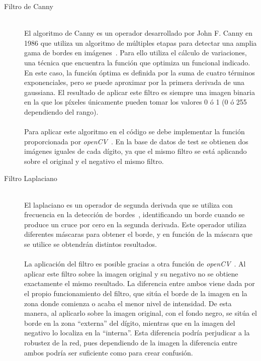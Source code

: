 \begin{description}
	\item[Filtro de Canny] \hfill 
	\vspace{5pt}
	\\
	El algoritmo de Canny es un operador desarrollado por John F. Canny en 1986 que utiliza un algoritmo de múltiples etapas para detectar una amplia gama de bordes en imágenes~\cite{4767851}. Para ello utiliza el cálculo de variaciones, una técnica que encuentra la función que optimiza un funcional indicado. En este caso, la función óptima es definida por la suma de cuatro términos exponenciales, pero se puede aproximar por la primera derivada de una gaussiana. El resultado de aplicar este filtro es siempre una imagen binaria en la que los píxeles únicamente pueden tomar los valores 0 ó 1 (0 ó 255 dependiendo del rango).\\
	\vspace{-10pt}
	\\
	Para aplicar este algoritmo en el código se debe implementar la función proporcionada por \textit{openCV}~\cite{cannyOCV}. En la base de datos de test se obtienen dos imágenes iguales de cada dígito, ya que el mismo filtro se está aplicando sobre el original y el negativo el mismo filtro.
	\vspace{5pt}
	\item[Filtro Laplaciano] \hfill 
	\vspace{5pt}
	\\
	El laplaciano es un operador de segunda derivada que se utiliza con frecuencia en la detección de bordes~\cite{gonzalez2008digital}, identificando un borde cuando se produce un cruce por cero en la segunda derivada. Este operador utiliza diferentes máscaras para obtener el borde, y en función de la máscara que se utilice se obtendrán distintos resultados.\\
	\vspace{-10pt}
	\\
	La aplicación del filtro es posible gracias a otra función de \textit{openCV}~\cite{laplacianOCV}. Al aplicar este filtro sobre la imagen original y su negativo no se obtiene exactamente el mismo resultado. La diferencia entre ambos viene dada por el propio funcionamiento del filtro, que sitúa el borde de la imagen en la zona donde comienza o acaba el menor nivel de intensidad. De esta manera, al aplicarlo sobre la imagen original, con el fondo negro, se sitúa el borde en la zona ``externa'' del dígito, mientras que en la imagen del negativo lo localiza en la ``interna''. Esta diferencia podría perjudicar a la robustez de la red, pues dependiendo de la imagen la diferencia entre ambos podría ser suficiente como para crear confusión.

\end{description}
